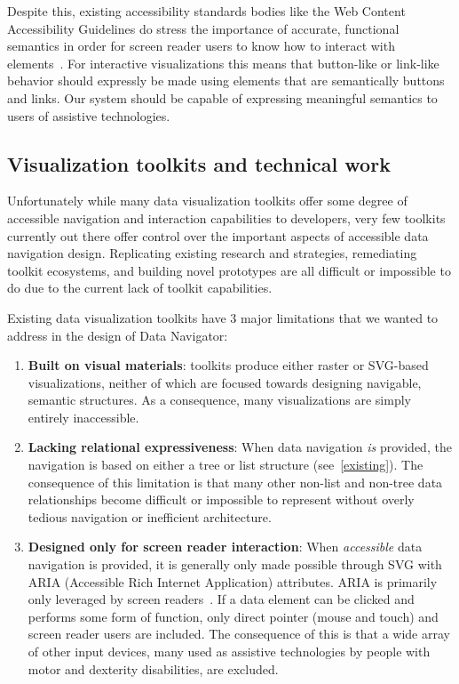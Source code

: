\documentclass[journal]{vgtc}                %
\begin{document}
Despite this, existing accessibility standards bodies like the Web Content Accessibility Guidelines do stress the importance of accurate, functional semantics in order for screen reader users to know how to interact with elements~\cite{WAI2021Semantics}. For interactive visualizations this means that button-like or link-like behavior should expressly be made using elements that are semantically buttons and links. Our system should be capable of expressing meaningful semantics to users of assistive technologies.

\subsection{Visualization toolkits and technical work}
Unfortunately while many data visualization toolkits offer some degree of accessible navigation and interaction capabilities to developers, very few toolkits currently out there offer control over the important aspects of accessible data navigation design. Replicating existing research and strategies, remediating toolkit ecosystems, and building novel prototypes are all difficult or impossible to do due to the current lack of toolkit capabilities.

Existing data visualization toolkits have 3 major limitations that we wanted to address in the design of Data Navigator:
\begin{enumerate}
  \itemsep-0.4em
  \item \textbf{Built on visual materials}: toolkits produce either raster or SVG-based visualizations, neither of which are focused towards designing navigable, semantic structures. As a consequence, many visualizations are simply entirely inaccessible.
  \item \textbf{Lacking relational expressiveness}: When data navigation \textit{is} provided, the navigation is based on either a tree or list structure (see~\autoref{existing}). The consequence of this limitation is that many other non-list and non-tree data relationships become difficult or impossible to represent without overly tedious navigation or inefficient architecture.
  \item \textbf{Designed only for screen reader interaction}: When \textit{accessible} data navigation is provided, it is generally only made possible through SVG with ARIA (Accessible Rich Internet Application) attributes. ARIA is primarily only leveraged by screen readers~\cite{WAI2017ARIA}. If a data element can be clicked and performs some form of function, only direct pointer (mouse and touch) and screen reader users are included. The consequence of this is that a wide array of other input devices, many used as assistive technologies by people with motor and dexterity disabilities, are excluded.
\end{enumerate}
\end{document}
